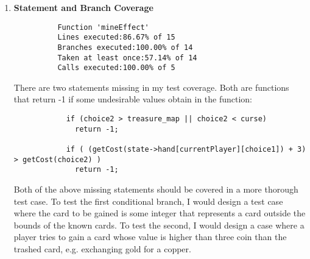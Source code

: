 \documentclass[11pt,letterpaper]{article}
\begin{document}
\begin{enumerate}[label=\Roman*.]
\begin{itemize}[leftmargin=*]
        \begin{enumerate}[leftmargin=*]
          \item \textbf{Statement and Branch Coverage}
          
          \begin{lstlisting}
          Function 'mineEffect'
          Lines executed:86.67% of 15
          Branches executed:100.00% of 14
          Taken at least once:57.14% of 14
          Calls executed:100.00% of 5
          \end{lstlisting}
          
            There are two statements missing in my test coverage. Both are functions
            that return -1 if some undesirable values obtain in the function: 
          \begin{lstlisting}
            if (choice2 > treasure_map || choice2 < curse)
              return -1;

            if ( (getCost(state->hand[currentPlayer][choice1]) + 3) > getCost(choice2) )
              return -1;
          \end{lstlisting}

          Both of the above missing statements should be covered in a more thorough test case. To
            test the first conditional branch, I would design a test case where the card to be
            gained is some integer that represents a card outside the bounds of the known cards.
            To test the second, I would design a case where a player tries to gain a card whose
            value is higher than three coin than the trashed card, e.g. exchanging gold for a copper.


\end{enumerate}
\end{itemize}
\end{enumerate}
\end{document}
